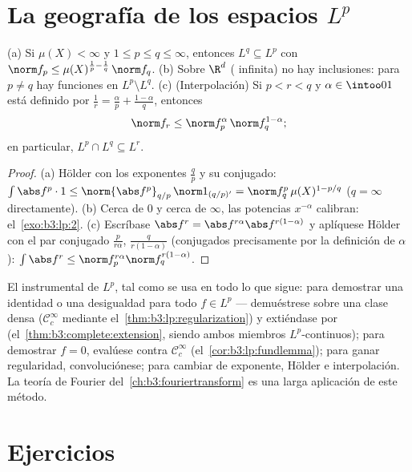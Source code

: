 \section{La geografía de los espacios \texorpdfstring{$L^p$}{Lp}}

\begin{proposition}\label{prop:b3:lp:inclusions}
(a) Si $\mu(X) < \infty$ y $1 \leq p \leq q \leq \infty$, entonces
$L^q \subseteq L^p$ con $\norm f_p \leq
\mu(X)^{\frac1p - \frac1q}\,\norm f_q$. (b) Sobre $\R^d$
( infinita) no hay inclusiones:
para $p \neq q$ hay funciones en $L^p\setminus L^q$. (c) (Interpolación)
Si $p < r < q$ y $\alpha \in \intoo01$ está definido por
$\frac1r = \frac\alpha p + \frac{1 - \alpha}q$, entonces
\[
\norm f_r \leq \norm f_p^{\alpha}\,\norm f_q^{1 - \alpha} ;
\]
en particular, $L^p \cap L^q \subseteq L^r$.
\end{proposition}

\begin{proof}
(a) Hölder con los exponentes $\frac qp$ y su conjugado:
$\int\abs f^p\cdot 1 \leq \norm{\abs f^p}_{q/p}\,\norm
1_{(q/p)'} = \norm f_q^p\,\mu(X)^{1 - p/q}$ ($q = \infty$
directamente). (b) Cerca de $0$ y cerca de $\infty$, las potencias
$x^{-\alpha}$ calibran: el~\cref{exo:b3:lp:2}. (c) Escríbase
$\abs f^r = \abs
f^{r\alpha}\abs f^{r(1-\alpha)}$ y aplíquese Hölder con el par conjugado
$\frac p{r\alpha}$, $\frac q{r(1-\alpha)}$ (conjugados precisamente por
la definición de $\alpha$):
$\int\abs f^r \leq \norm f_p^{r\alpha}\norm f_q^{r(1 -
\alpha)}$.
\end{proof}

\begin{method}\label{met:b3:lp:toolkit}
El instrumental de $L^p$, tal como se usa en todo lo que sigue: para
demostrar una identidad o una desigualdad para todo $f \in L^p$ ---
demuéstrese sobre una clase densa ($\mathcal C_c^\infty$ mediante
el~\cref{thm:b3:lp:regularization}) y extiéndase por
(el~\cref{thm:b3:complete:extension}, siendo ambos miembros
$L^p$-continuos); para demostrar $f = 0$, evalúese contra $\mathcal
C_c^\infty$ (el~\cref{cor:b3:lp:fundlemma}); para ganar regularidad,
convoluciónese; para cambiar de exponente, Hölder e interpolación. La
teoría de Fourier del~\cref{ch:b3:fouriertransform} es una larga
aplicación de este método.
\end{method}

\section{Ejercicios}

